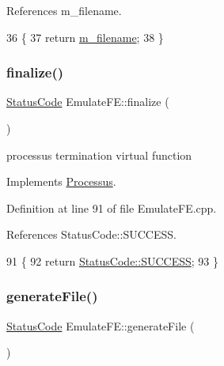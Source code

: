 References m\+\_\+filename.


\begin{DoxyCode}
36                   \{
37     \textcolor{keywordflow}{return} \hyperlink{classEmulateFE_a103fedea9eb5d3963573f9120cb81a68}{m\_filename};
38   \}
\end{DoxyCode}
\mbox{\label{classEmulateFE_a7d29ee79a606d0f7d337b1e78ef54a03}} 
\subsubsection{\texorpdfstring{finalize()}{finalize()}}
{\footnotesize\ttfamily \hyperlink{classStatusCode}{Status\+Code} Emulate\+F\+E\+::finalize (\begin{DoxyParamCaption}{ }\end{DoxyParamCaption})\hspace{0.3cm}{\ttfamily [virtual]}}

processus termination virtual function 

Implements \hyperlink{classProcessus_aba93d691f031bdb18ae4b8afb1b2e856}{Processus}.



Definition at line 91 of file Emulate\+F\+E.\+cpp.



References Status\+Code\+::\+S\+U\+C\+C\+E\+SS.


\begin{DoxyCode}
91                                  \{
92   \textcolor{keywordflow}{return} \hyperlink{classStatusCode_a6f565cbeadc76d14c72f047e5e85eb4badd0da38d3ba0d922efd1f4619bc37ad8}{StatusCode::SUCCESS};
93 \}
\end{DoxyCode}
\mbox{\label{classEmulateFE_ae62bc56b44c4bcdf7f5eab5cbde2cd69}} 
\subsubsection{\texorpdfstring{generate\+File()}{generateFile()}}
{\footnotesize\ttfamily \hyperlink{classStatusCode}{Status\+Code} Emulate\+F\+E\+::generate\+File (\begin{DoxyParamCaption}{ }\end{DoxyParamCaption})\hspace{0.3cm}{\ttfamily [protected]}}



